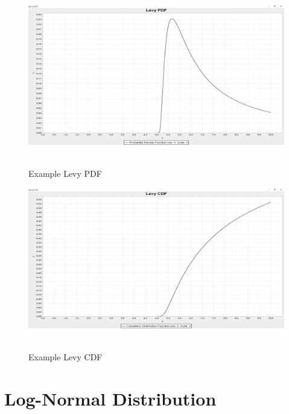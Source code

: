 		\begin{figure}[H]
			\centering
			\includegraphics[width=1\textwidth]{Figures/implemented_functions/levy_pdf}~\\
			\caption{Example Levy PDF}
			\label{fig:levy_pdf}
		\end{figure}


		\begin{figure}[H]
			\centering
			\includegraphics[width=1\textwidth]{Figures/implemented_functions/levy_cdf}~\\
			\caption{Example Levy CDF}
			\label{fig:levy_cdf}
		\end{figure}


	\section{Log-Normal Distribution}
	
